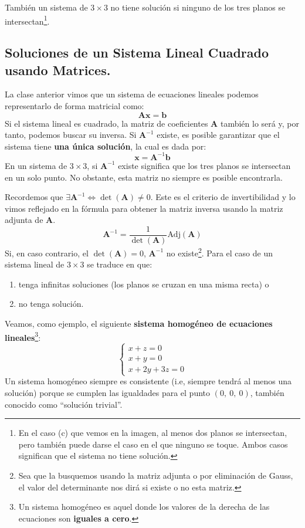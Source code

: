 \documentclass[12pt]{article}
\begin{document}
También un sistema de $3 \times 3$ no tiene solución si ninguno de los tres planos se intersectan\footnote{En el caso (c) que vemos en la imagen, al menos dos planos se intersectan, pero también puede darse el caso en el que ninguno se toque. Ambos casos significan que el sistema no tiene solución.}.

\subsection{Soluciones de un Sistema Lineal Cuadrado usando Matrices.}

La clase anterior vimos que un sistema de ecuaciones lineales podemos representarlo de forma matricial como:
\[
  \mathbf{A} \mathbf{x} = \mathbf{b}
\]
Si el sistema lineal es cuadrado, la matriz de coeficientes $\mathbf{A}$ también lo será y, por tanto, podemos buscar su inversa. Si $\mathbf{A}^{-1}$ existe, es posible garantizar que el sistema tiene \textbf{una única solución}, la cual es dada por:
\[
  \mathbf{x} = \mathbf{A}^{-1} \mathbf{b}
\]
En un sistema de $3 \times 3$, si $\mathbf{A}^{-1}$ existe significa que los tres planos se intersectan en un solo punto. No obstante, esta matriz no siempre es posible encontrarla.

Recordemos que $\exists \mathbf{A}^{-1} \iff \det(\mathbf{A}) \neq 0$. Este es el criterio de invertibilidad y lo vimos reflejado en la fórmula para obtener la matriz inversa usando la matriz adjunta de $\mathbf{A}$.
\[
  \mathbf{A}^{-1} = \frac{1}{\det(\mathbf{A})} \text{Adj}(\mathbf{A})
\]
Si, en caso contrario, el $\det(\mathbf{A}) = 0$, $\mathbf{A}^{-1}$ no existe\footnote{Sea que la busquemos usando la matriz adjunta o por eliminación de Gauss, el valor del determinante nos dirá si existe o no esta matriz.}. Para el caso de un sistema lineal de $3 \times 3$ se traduce en que:

\begin{enumerate}
\item tenga infinitas soluciones (los planos se cruzan en una misma recta) o
\item no tenga solución.
\end{enumerate}

Veamos, como ejemplo, el siguiente \textbf{sistema homogéneo de ecuaciones lineales}\footnote{Un sistema homogéneo es aquel donde los valores de la derecha de las ecuaciones son \textbf{iguales a cero}.}:
\[
\left\{
\begin{aligned}
x + z = 0 \\
x + y = 0 \\
x + 2y + 3z = 0
\end{aligned}
\right.
\]
Un sistema homogéneo siempre es consistente (i.e, siempre tendrá al menos una solución) porque se cumplen las igualdades para el punto $(0, \ 0, \ 0)$, también conocido como ``solución trivial''.
\end{document}
